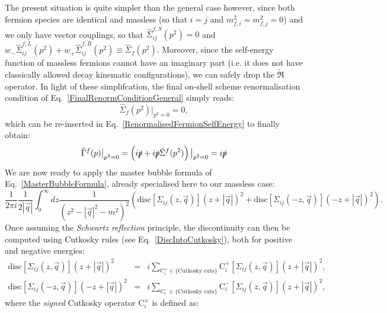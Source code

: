 \documentclass[11pt]{article}
\begin{document}
The present situation is quite simpler than the general case however, since both fermion species are identical and massless (so that $i=j$ and $m_{f,i}^2=m_{f,j}^2=0$) and we only have vector couplings, so that $\hat{\Sigma}_{ij}^{f,S}(p^2)=0$ and $w_- \hat{\Sigma}_{ij}^{f,L}(p^2) + w_+ \hat{\Sigma}_{ij}^{f,R}(p^2) \equiv \hat{\Sigma}_{f}(p^2)$. Moreover, since the self-energy function of massless fermions cannot have an imaginary part (i.e. it does not have classically allowed decay kinematic configurations), we can safely drop the $ \tilde{\Re}$ operator.
In light of these simplifcation, the final on-shell scheme renormalisation condition of Eq.~\ref{FinalRenormConditionGeneral} simply reads:
\begin{equation}
\hat{\Sigma}_{f}(p^2){\big |}_{p^2=0}=0,
\end{equation}
which can be re-inserted in Eq.~\ref{RenormalisedFermionSelfEnergy} to finally obtain:
\begin{equation}
\hat{\Gamma}^{f}(p) {\big |}_{p^2=0} = \left ( 
i \slashed{p} + i \slashed{p} \hat{\Sigma}^{f}(p^2) 
\right ) {\big |}_{p^2=0} = i \slashed{p} 
\end{equation}
We are now ready to apply the master bubble formula of Eq.~\ref{MasterBubbleFormula}, already specialised here to our massless case:
\begin{equation}
\frac{ 1 }{2\pi i} \frac{1}{2 |\vec{q}| } \int_{0}^\infty d z \frac{1}{( z^2 - |\vec{q}|^2-m^2)^2 }\left(
\textrm{disc} \left[ \Sigma_{ij}(z, \vec{q}) \right] \left( z + |\vec{q}| \right)^2
+ \textrm{disc} \left[ \Sigma_{ij}(-z, \vec{q}) \right] \left( -z + |\vec{q}| \right)^2
\right).
\end{equation}
Once assuming the \emph{Schwartz reflection} principle, the discontinuity can then be computed using Cutkosky rules (see Eq.~\ref{DiscIntoCutkosky}), both for positive and negative energies:
\begin{eqnarray}
\textrm{disc} \left[ \Sigma_{ij}(z, \vec{q}) \right] \left( z + |\vec{q}| \right)^2 &=&  i \sum_{\textrm{C}_i^{+}\in\{\textrm{Cutkosky cuts}\}} \textrm{C}_i^{+}\left[ \Sigma_{ij}(z, \vec{q})\right ] \left( z + |\vec{q}| \right)^2, \\
\textrm{disc} \left[ \Sigma_{ij}(-z, \vec{q}) \right] \left( -z + |\vec{q}| \right)^2 &=&  i \sum_{\textrm{C}_i^{-}\in\{\textrm{Cutkosky cuts}\}} \textrm{C}_i^{-}\left[ \Sigma_{ij}(z, \vec{q})\right ] \left( z + |\vec{q}| \right)^2,
\end{eqnarray}
where the \emph{signed} Cutkosky operator $\textrm{C}_i^{\pm}$ is defined as:
\end{document}
